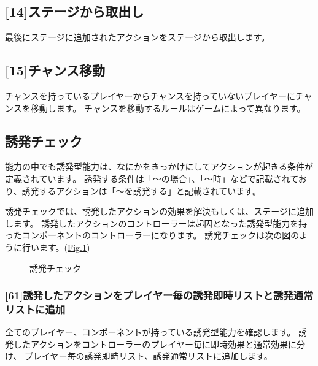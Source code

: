 \documentclass[letterpaper,10pt,dvipdfmx]{sphinxmanual}
\begin{document}
\subsection{{[}14{]}ステージから取出し}
\label{\detokenize{core/core:id27}}
\sphinxAtStartPar
最後にステージに追加されたアクションをステージから取出します。


\subsection{{[}15{]}チャンス移動}
\label{\detokenize{core/core:id28}}
\sphinxAtStartPar
チャンスを持っているプレイヤーからチャンスを持っていないプレイヤーにチャンスを移動します。
チャンスを移動するルールはゲームによって異なります。


\subsection{誘発チェック}
\label{\detokenize{core/core:trigger-check}}\label{\detokenize{core/core:id29}}
\sphinxAtStartPar
能力の中でも誘発型能力は、なにかをきっかけにしてアクションが起きる条件が定義されています。
誘発する条件は「〜の場合」、「〜時」などで記載されており、誘発するアクションは「〜を誘発する」と記載されています。

\sphinxAtStartPar
誘発チェックでは、誘発したアクションの効果を解決もしくは、ステージに追加します。
誘発したアクションのコントローラーは起因となった誘発型能力を持ったコンポーネントのコントローラーになります。
誘発チェックは次の図のように行います。(\hyperref[\detokenize{core/core:trigger-flow}]{Fig.\@ \ref{\detokenize{core/core:trigger-flow}}})

\begin{figure}[htbp]
\centering
\capstart

\noindent{}
\caption{誘発チェック}\label{\detokenize{core/core:id47}}\label{\detokenize{core/core:trigger-flow}}\end{figure}


\subsubsection{{[}6\sphinxhyphen{}1{]}誘発したアクションをプレイヤー毎の誘発即時リストと誘発通常リストに追加}
\label{\detokenize{core/core:trigger-act-gather}}\label{\detokenize{core/core:id30}}
\sphinxAtStartPar
全てのプレイヤー、コンポーネントが持っている誘発型能力を確認します。
誘発したアクションをコントローラーのプレイヤー毎に即時効果と通常効果に分け、
プレイヤー毎の誘発即時リスト、誘発通常リストに追加します。
\end{document}
